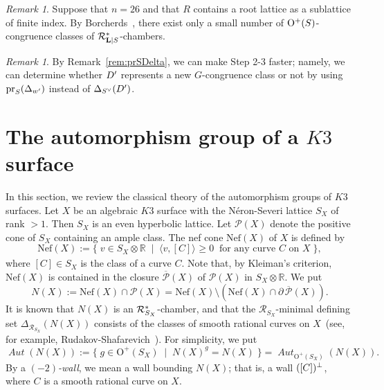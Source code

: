 \documentclass{amsart}
\theoremstyle{plain}
\theoremstyle{definition}
\theoremstyle{remark}
\newtheorem{remark}[theorem]{Remark}
\numberwithin{equation}{section}
\numberwithin{table}{section}
\numberwithin{figure}{section}
\newcommand{\D}{\mathord{\mathbb D}}
\renewcommand{\P}{\mathord{\mathbb  P}}
\newcommand{\R}{\mathord{\mathbb R}}
\newcommand{\PPP}{\mathord{\mathcal P}}
\newcommand{\RRR}{\mathord{\mathcal R}}
\newcommand{\set}[2]{\{\; {#1} \; \mid \; {#2} \;  \}}
\newcommand{\tensor}{\otimes}
\newcommand{\sprime}{\sp\prime}
\newcommand{\sperp}{\sp{\perp}}
\newcommand{\dual}{\sp{\vee}}
\newcommand{\bdr}{\partial\,}
\newcommand{\OG}{\mathord{\mathrm {O}}}
\newcommand{\pr}{\mathord{\mathrm {pr}}}
\renewcommand{\L}{\mathord{\mathbf{L}}}
\newcommand{\Nef}{\mathord{\mathrm{Nef}}}
\newcommand{\intM}[2]{\langle{#1}\rangle_{#2}}
\newcommand{\aut}{\operatorname{\mathit {Aut}}\nolimits}
\newcommand{\Chams}{\D}
\newcommand{\Roots}{\RRR}
\newcommand{\sphyp}{\sp*}
\newcommand{\clPPP}{\overline{\PPP}}
\newcommand{\RtsLS}{\Roots_{\L|S}}
\newcommand{\Nc}{N}
\begin{document}
%
\begin{remark}\label{rem:Rroots}
Suppose that $n=26$ and that $R$ contains  a root lattice
as a sublattice of finite index.
By  Borcherds~\cite[Lemma 5.1]{MR913200},
there exist only a small number of  $\OG\sp+(S)$-congruence classes of $\RtsLS\sphyp$-chambers. 
\end{remark}
%
%
\begin{remark}\label{rem:speedup}
By Remark~\ref{rem:prSDelta}, 
we can make Step 2-3 faster;
namely, we can determine whether $D\sprime$ represents a new $G$-congruence class or not by
using $\pr_S(\Delta_{w\sprime})$ instead of $\Delta_{S\dual}(D\sprime)$.
\end{remark}
%
\section{The automorphism group of a $K3$ surface}\label{sec:AutX}
%
In this section, we review the classical theory of the automorphism groups of  $K3$ surfaces.
Let $X$ be an algebraic  $K3$ surface
with the N\'eron-Severi lattice $S_X$
of rank $>1$.
Then $S_X$ is an even hyperbolic lattice.
Let $\PPP(X)$ denote the positive cone of $S_X$ containing an ample class.
The nef cone $\Nef(X)$ of $X$ is defined by
$$
\Nef(X):=\set{v\in S_X\tensor\R}{\intM{v, [C]}{}\ge 0\;\;\textrm{for any curve $C$ on $X$}},
$$
where $[C]\in S_X$ is the class of a curve $C$.
Note that, by Kleiman's criterion, %
$\Nef(X)$ is contained in the closure $\clPPP(X)$ of $\PPP(X)$ in $S_X\tensor\R$.
We put
$$
\Nc(X):=\Nef(X)\cap \PPP(X)=\Nef(X)\setminus (\Nef(X) \cap \bdr \clPPP(X)).
$$
It is known that $\Nc(X)$ is an $\Roots_{S_X}\sphyp$-chamber,
and that the $\Roots_{S_X}$-minimal defining set $\Delta_{\Roots_{S_X}}(\Nc(X))$
consists of the classes of smooth rational curves on $X$~(see, for example, Rudakov-Shafarevich~\cite{MR633161}).
For simplicity, we put
$$
\aut(\Nc(X)):=\set{g\in \OG^+({S_X})}{\Nc(X)^g=\Nc(X)}=\aut_{\OG^+({S_X})}(\Nc(X)).
$$
By a \emph{$(-2)$-wall},
we mean a wall bounding $\Nc(X)$;
that is, a wall $([C])\sperp$, where $C$ is a smooth rational curve on $X$.
%
\end{document}
